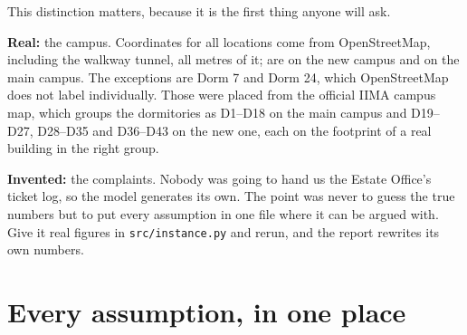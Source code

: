 \documentclass[11pt]{article}
\begin{document}
This distinction matters, because it is the first thing anyone will ask.

\textbf{Real:} the campus. Coordinates for all \NLocations{} locations come
from OpenStreetMap, including the walkway tunnel, all \NTunnelMetres{} metres
of it; \NNewCampus{} are on the new campus and \NOldCampus{} on the main
campus. The exceptions are Dorm 7 and Dorm 24, which OpenStreetMap does not
label individually. Those were placed from the official IIMA campus map,
which groups the dormitories as D1--D18 on the main campus and D19--D27,
D28--D35 and D36--D43 on the new one, each on the footprint of a real
building in the right group.

\textbf{Invented:} the complaints. Nobody was going to hand us the Estate
Office's ticket log, so the model generates its own. The point was never to
guess the true numbers but to put every assumption in one file where it can
be argued with. Give it real figures in \texttt{src/instance.py} and rerun,
and the report rewrites its own numbers.

\section{Every assumption, in one place}
\end{document}
